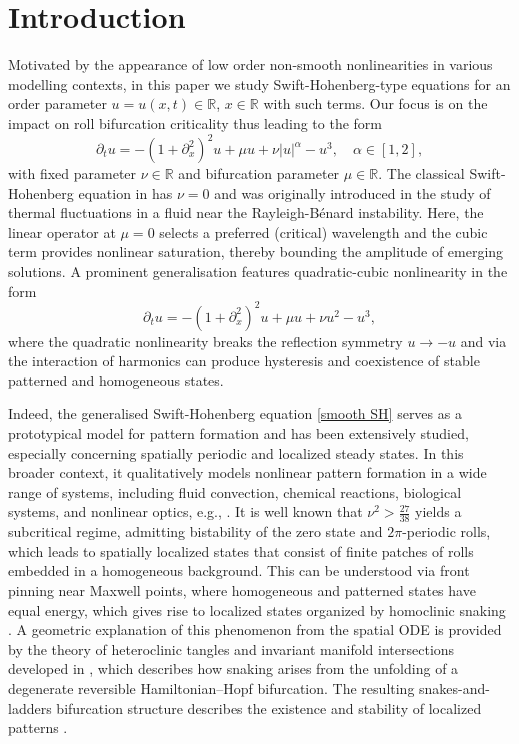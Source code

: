 \documentclass{article}
\numberwithin{equation}{section}
\begin{document}
\section{Introduction}\label{sec:intro}
Motivated by the appearance of low order non-smooth nonlinearities in various modelling contexts, in this paper we study Swift-Hohenberg-type equations for an order parameter $u = u(x, t) \in \mathbb{R}$, $x \in \mathbb{R}$ with such terms.  
Our focus is on the impact on roll bifurcation criticality thus leading to the form
\begin{equation} \label{nonsmooth SHE}
	\partial_t u= -(1+\partial_x^2)^2 u + \mu u + \nu |u|^{\alpha} -u^3,  \quad \alpha \in [1,2],
\end{equation}
with fixed parameter $\nu \in\mathbb{R}$ and bifurcation parameter $\mu \in \mathbb{R}$. The classical Swift-Hohenberg equation in \cite{SwiftHohenberg1977} has $\nu=0$ and was originally introduced in the study of thermal fluctuations in a fluid near the Rayleigh-B\'enard instability. Here, the linear operator at $\mu=0$ selects a preferred (critical) wavelength and the cubic term provides nonlinear saturation, thereby bounding the amplitude of emerging solutions. A prominent generalisation features quadratic-cubic nonlinearity in the form
\begin{equation}\label{smooth SH}
	\partial_t u = -(1 + \partial_x^2)^2 u + \mu u + \nu u^2 -u^3, 
\end{equation}
where the quadratic nonlinearity breaks the reflection symmetry $u \rightarrow -u$ and via the interaction of harmonics  
can produce hysteresis and coexistence of stable patterned and homogeneous states.


Indeed, the generalised Swift-Hohenberg equation \eqref{smooth SH} serves as a prototypical model for pattern formation and has been extensively studied, especially concerning spatially periodic and localized steady states. In this broader context, it qualitatively models nonlinear pattern formation in a wide range of systems, including fluid convection, chemical reactions, biological systems, and nonlinear optics, e.g., \cite{CrossHohenberg1993,CrossGreenside2009}. It is well known that $\nu^2>\tfrac{27}{38}$ yields a subcritical regime, admitting bistability of the zero state and $2\pi$-periodic rolls, which leads to spatially localized states that consist of finite patches of rolls embedded in a homogeneous background. This can be understood via front pinning near Maxwell points, where homogeneous and patterned states have equal energy, which gives rise to localized states organized by homoclinic snaking \cite{BurkeKnobloch2006,BurkeKnobloch2007}. A geometric explanation of this phenomenon from the spatial ODE is provided by the theory of heteroclinic tangles and invariant manifold intersections developed in \cite{WoodsChampneys1999}, which describes how snaking arises from the unfolding of a degenerate reversible Hamiltonian--Hopf bifurcation. The resulting snakes-and-ladders bifurcation structure describes the existence and stability of localized patterns \cite{Beck2009}.
\end{document}
